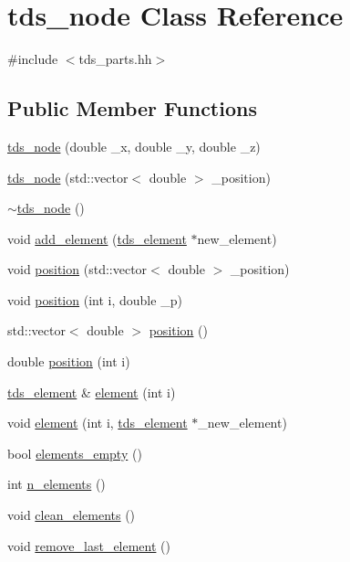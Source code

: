 \hypertarget{classtds__node}{}\section{tds\+\_\+node Class Reference}
\label{classtds__node}


{\ttfamily \#include $<$tds\+\_\+parts.\+hh$>$}

\subsection*{Public Member Functions}
\begin{DoxyCompactItemize}
\item 
\hyperlink{classtds__node_aae4e896d901f88ab725df449454412e4}{tds\+\_\+node} (double \+\_\+x, double \+\_\+y, double \+\_\+z)
\item 
\hyperlink{classtds__node_ad485694533fbe32047035cf9c4ffca48}{tds\+\_\+node} (std\+::vector$<$ double $>$ \+\_\+position)
\item 
\hyperlink{classtds__node_afd27a4e35834832cb923db673ee4b3ee}{$\sim$tds\+\_\+node} ()
\item 
void \hyperlink{classtds__node_a678be3112890f9998796c2c7033e2e91}{add\+\_\+element} (\hyperlink{classtds__element}{tds\+\_\+element} $\ast$new\+\_\+element)
\item 
void \hyperlink{classtds__node_a6967a1b6824ff0cb64c901746994a9a2}{position} (std\+::vector$<$ double $>$ \+\_\+position)
\item 
void \hyperlink{classtds__node_a8cf9300cdb4b20bbebf9a2f04b37695f}{position} (int i, double \+\_\+p)
\item 
std\+::vector$<$ double $>$ \hyperlink{classtds__node_ac4fbb78ffb5d7c27384c9ca0bb16f39e}{position} ()
\item 
double \hyperlink{classtds__node_ab9fc6244a5657f8bd6eaea8bf86f0346}{position} (int i)
\item 
\hyperlink{classtds__element}{tds\+\_\+element} \& \hyperlink{classtds__node_ae0efbd59681b496e53ee685e1b7d59a6}{element} (int i)
\item 
void \hyperlink{classtds__node_a9d329513511f86cc828792e4eff4c3e7}{element} (int i, \hyperlink{classtds__element}{tds\+\_\+element} $\ast$\+\_\+new\+\_\+element)
\item 
bool \hyperlink{classtds__node_a285d91e52abf56986f50a91e615cf9f5}{elements\+\_\+empty} ()
\item 
int \hyperlink{classtds__node_a4066ea71ef3ea4329c82aef6ee0ff41a}{n\+\_\+elements} ()
\item 
void \hyperlink{classtds__node_a7fd1af280d8db87fa3a1c4942f54420c}{clean\+\_\+elements} ()
\item 
void \hyperlink{classtds__node_a9659601fc4789ccaad501018f864dc2a}{remove\+\_\+last\+\_\+element} ()
\end{DoxyCompactItemize}


